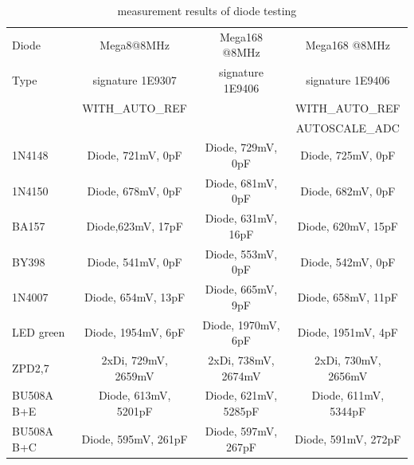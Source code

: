 \begin{table}[H]
  \begin{center}
    \begin{tabular}{| l | c | c | c |}
    \hline
     Diode & Mega8@8MHz & Mega168 @8MHz & Mega168 @8MHz \\
     Type  & signature 1E9307 & signature 1E9406 & signature 1E9406 \\
           & WITH\_AUTO\_REF &  & WITH\_AUTO\_REF \\
           &                 &  & AUTOSCALE\_ADC \\
    \hline
    \hline
1N4148 & Diode, 721mV, 0pF & Diode, 729mV, 0pF & Diode, 725mV, 0pF\\
    \hline
1N4150 & Diode, 678mV, 0pF & Diode, 681mV, 0pF & Diode, 682mV, 0pF\\
    \hline
BA157 & Diode,623mV, 17pF & Diode, 631mV, 16pF & Diode, 620mV, 15pF\\
    \hline
BY398 & Diode, 541mV, 0pF & Diode, 553mV, 0pF & Diode, 542mV, 0pF\\
    \hline
1N4007 & Diode, 654mV, 13pF & Diode, 665mV, 9pF & Diode, 658mV, 11pF\\
    \hline
LED green & Diode, 1954mV, 6pF & Diode, 1970mV, 6pF & Diode, 1951mV, 4pF\\
    \hline
ZPD2,7 & 2xDi, 729mV, 2659mV & 2xDi, 738mV, 2674mV & 2xDi, 730mV, 2656mV \\
    \hline
BU508A B+E & Diode, 613mV, 5201pF & Diode, 621mV, 5285pF & Diode, 611mV, 5344pF\\
    \hline
BU508A B+C & Diode, 595mV, 261pF & Diode, 597mV, 267pF & Diode, 591mV, 272pF\\
    \hline
    \end{tabular}
  \end{center}
  \caption{measurement results of diode testing}
  \label{tab:diodes} 
\end{table}

